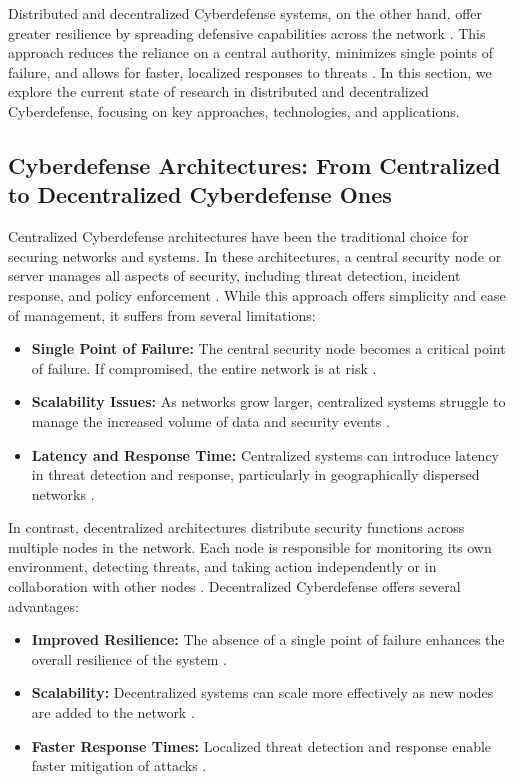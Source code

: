 Distributed and decentralized Cyberdefense systems, on the other hand, offer greater resilience by spreading defensive capabilities across the network \cite{Oliynykov2022}. This approach reduces the reliance on a central authority, minimizes single points of failure, and allows for faster, localized responses to threats \cite{Kott2021}. In this section, we explore the current state of research in distributed and decentralized Cyberdefense, focusing on key approaches, technologies, and applications.


\subsection{Cyberdefense Architectures: From Centralized to Decentralized Cyberdefense Ones}

Centralized Cyberdefense architectures have been the traditional choice for securing networks and systems. In these architectures, a central security node or server manages all aspects of security, including threat detection, incident response, and policy enforcement \cite{Jansen2011}. While this approach offers simplicity and ease of management, it suffers from several limitations:

\begin{itemize}
    \item \textbf{Single Point of Failure:} The central security node becomes a critical point of failure. If compromised, the entire network is at risk \cite{Mell2011}.
    \item \textbf{Scalability Issues:} As networks grow larger, centralized systems struggle to manage the increased volume of data and security events \cite{Xu2019}.
    \item \textbf{Latency and Response Time:} Centralized systems can introduce latency in threat detection and response, particularly in geographically dispersed networks \cite{Benet2014}.
\end{itemize}

In contrast, decentralized architectures distribute security functions across multiple nodes in the network. Each node is responsible for monitoring its own environment, detecting threats, and taking action independently or in collaboration with other nodes \cite{Xu2019}. Decentralized Cyberdefense offers several advantages:

\begin{itemize}
    \item \textbf{Improved Resilience:} The absence of a single point of failure enhances the overall resilience of the system \cite{Zohar2015}.
    \item \textbf{Scalability:} Decentralized systems can scale more effectively as new nodes are added to the network \cite{Xu2019}.
    \item \textbf{Faster Response Times:} Localized threat detection and response enable faster mitigation of attacks \cite{Benet2014}.
\end{itemize}


